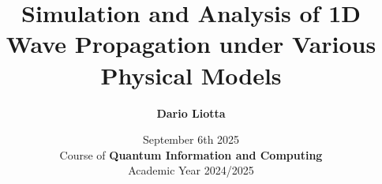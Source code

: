 \documentclass[10pt,externalviewer]{beamer}
\title{Simulation and Analysis of 1D Wave Propagation under Various Physical Models}
\author[Dario Liotta]{\large{\textbf{Dario Liotta}}}
\institute[Physics of Data (UniPD)]{
\begin{minipage}[c]{3.4truecm}
\texttt{[image: logo-unipd]}
\end{minipage}
\begin{minipage}[c]{2truecm}
   \begin{flushleft}
   \end{flushleft}
\end{minipage}
\begin{minipage}[c]{4.2truecm}
\texttt{[image: logo-dfa]}
\end{minipage}}
\date{September 6th 2025 \\ Course of \textbf{Quantum Information and Computing} \\ Academic Year 2024/2025}
\begin{document}
\begin{frame}[plain]
\titlepage
\end{frame}






\end{document}
